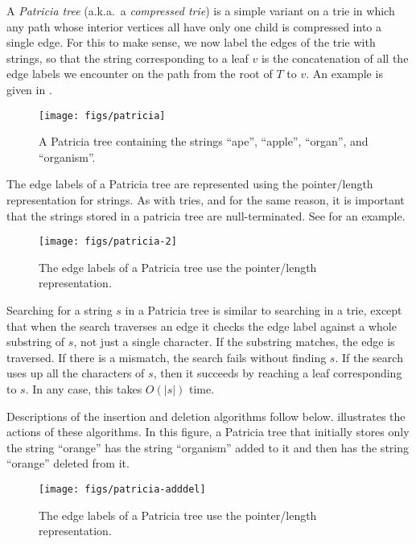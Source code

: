 A \emph{Patricia tree} (a.k.a.\ a \emph{compressed trie}) is a simple
variant on a trie in which any path whose interior vertices all have only
one child is compressed into a single edge.  For this to make sense,
we now label the edges of the trie with strings, so that the string
corresponding to a leaf $v$ is the concatenation of all the edge labels
we encounter on the path from the root of $T$ to $v$. 
An example is given in .

\begin{figure}
  \begin{center}
    \texttt{[image: figs/patricia]}
  \end{center}
  \caption{A Patricia tree containing the strings ``ape'', ``apple'', ``organ'', and ``organism''.}
\end{figure}

The edge labels of a Patricia tree are represented using the
pointer/length representation for strings.  As with tries, and for the
same reason, it is important that the strings stored in a patricia tree
are null-terminated.  See  for an example.

\begin{figure}
  \begin{center}
    \texttt{[image: figs/patricia-2]}
  \end{center}
  \caption{The edge labels of a Patricia tree use the pointer/length representation.}
\end{figure}

Searching for a string $s$ in a Patricia tree is similar to searching
in a trie, except that when the search traverses an edge it checks the
edge label against a whole substring of $s$, not just a single character.
If the substring matches, the edge is traversed. If there is a mismatch,
the search fails without finding $s$.  If the search uses up all the
characters of $s$, then it succeeds by reaching a leaf corresponding
to $s$.  In any case, this takes $O(|s|)$ time.

Descriptions of the insertion and deletion algorithms follow below.
 illustrates the actions of these algorithms.
In this figure, a Patricia tree that initially stores only the string
``orange'' has the string ``organism'' added to it and then has the string
``orange'' deleted from it.

\begin{figure}
  \begin{center}
    \texttt{[image: figs/patricia-adddel]}
  \end{center}
  \caption{The edge labels of a Patricia tree use the pointer/length representation.}
\end{figure}

